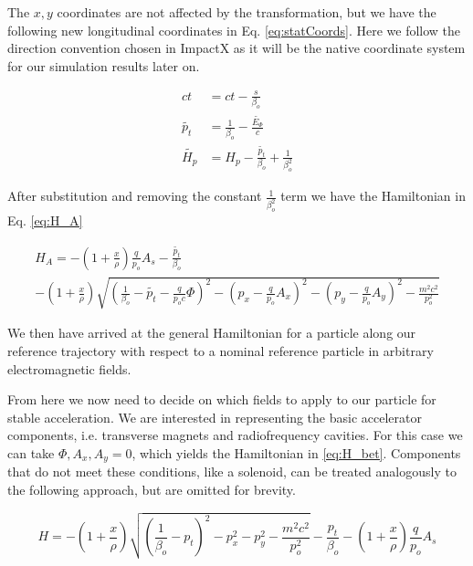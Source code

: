 The $x,y$ coordinates are not affected by the transformation, but we have the following new longitudinal coordinates in Eq. \ref{eq:statCoords}. Here we follow the direction convention chosen in ImpactX as it will be the native coordinate system for our simulation results later on.

\begin{equation} \label{eq:statCoords}
\begin{split}
	ct &= ct - \frac{s}{\beta_o}\\
	\tilde{p_t} &= \frac{1}{\beta_o} - \frac{\tilde{E_{\Phi}}}{c}\\
	\tilde{H_p} &= H_p - \frac{\tilde{p_t}}{\beta_o} + \frac{1}{\beta_o^2}
\end{split}
\end{equation}

After substitution and removing the constant $\frac{1}{\beta_o^2}$ term we have the Hamiltonian in Eq. \ref{eq:H_A}

\begin{multline} \label{eq:H_A}
	H_A = - \left(1 + \frac{x}{\rho}\right)\frac{q}{p_o}A_s - \frac{\tilde{p_t}}{\beta_o}\\
	-\left(1 + \frac{x}{\rho}\right)\sqrt{\left(\frac{1}{\beta_o} - \tilde{p_t}  - \frac{q}{p_o c}\Phi\right)^2 - \left(p_x -\frac{q}{p_o} A_x\right)^2 - \left(p_y - \frac{q}{p_o} A_y\right)^2 - \frac{m^2c^2}{p_o^2}}
\end{multline}

We then have arrived at the general Hamiltonian for a particle along our reference trajectory with respect to a nominal reference particle in arbitrary electromagnetic fields. 

From here we now need to decide on which fields to apply to our particle for stable acceleration. We are interested in representing the basic accelerator components, i.e. transverse magnets and radiofrequency cavities. For this case we can take $\Phi, A_x, A_y = 0$, which yields the Hamiltonian in \ref{eq:H_bet}. Components that do not meet these conditions, like a solenoid, can be treated analogously to the following approach, but are omitted for brevity.

\begin{equation} \label{eq:H_bet}
	H = -\left(1 + \frac{x}{\rho}\right)\sqrt{\left(\frac{1}{\beta_o} - p_t \right)^2 - p_x^2 - p_y^2- \frac{m^2c^2}{p_o^2}} - \frac{p_t}{\beta_o} - \left(1 + \frac{x}{\rho}\right)\frac{q}{p_o}A_s
\end{equation}

